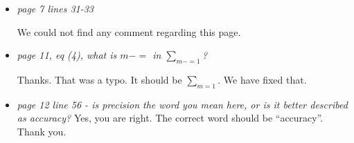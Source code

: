 \documentclass[11pt]{article}
\begin{document}
\begin{itemize}
\item \textit{page 7 lines 31-33}

We could not find any comment regarding this page. 

  
\item \textit{page 11, eq (4), what is \(m-=\) in \(\sum_{m-=1}\)?}

  Thanks. That was a typo. It should be \(\sum_{m=1}\). We have fixed that. 
  
\item \textit{page 12 line 56 - is precision the word you mean here, or is it
    better described as accuracy?}
  Yes, you are right. The correct word should be ``accuracy''. Thank you. 
\end{itemize}



\end{document}
